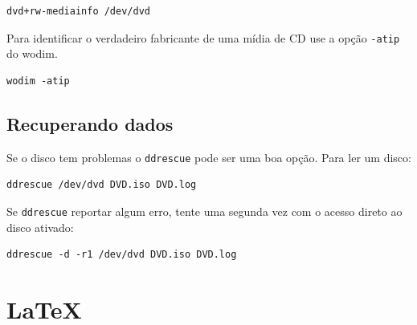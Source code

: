 \documentclass[12pt,brazil]{book}
\begin{document}
\begin{verbatim}
dvd+rw-mediainfo /dev/dvd
\end{verbatim}

Para identificar o verdadeiro fabricante de uma mídia de CD use a
opção \texttt{-atip} do wodim.

\begin{verbatim}
wodim -atip 
\end{verbatim}

\section{Recuperando dados}
\label{sec:recuperando-dados}

Se o disco tem problemas o \texttt{ddrescue} pode ser uma boa opção.
Para ler um disco:

\begin{verbatim}
ddrescue /dev/dvd DVD.iso DVD.log
\end{verbatim}

Se \texttt{ddrescue} reportar algum erro, tente uma segunda vez com o
acesso direto ao disco ativado:

\begin{verbatim}
ddrescue -d -r1 /dev/dvd DVD.iso DVD.log
\end{verbatim}

\chapter{LaTeX}
\label{cha:latex}
\end{document}
